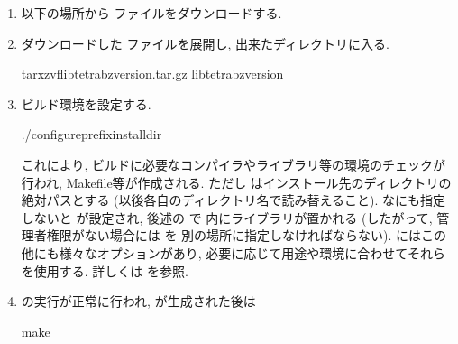 \documentclass[letterpaper,10pt,dvipdfmx,openany]{sphinxmanual}
\begin{document}
\label{\detokenize{install:id4}}\begin{enumerate}
%
\item {} 
\sphinxAtStartPar
以下の場所から  ファイルをダウンロードする.

\sphinxAtStartPar
{}

\item {} 
\sphinxAtStartPar
ダウンロードした  ファイルを展開し,
出来たディレクトリに入る.

\begin{sphinxVerbatim}[commandchars=\\\{\}]
\PYGZdl{}tarxzvflibtetrabz\PYGZhy{}version.tar.gz
\PYGZdl{}libtetrabz\PYGZhy{}version
\end{sphinxVerbatim}

\item {} 
\sphinxAtStartPar
ビルド環境を設定する.

\begin{sphinxVerbatim}[commandchars=\\\{\}]
\PYGZdl{}./configure\PYGZhy{}\PYGZhy{}prefixinstall\PYGZus{}dir
\end{sphinxVerbatim}

\sphinxAtStartPar
これにより, ビルドに必要なコンパイラやライブラリ等の環境のチェックが行われ,
Makefile等が作成される.
ただし  はインストール先のディレクトリの絶対パスとする (以後各自のディレクトリ名で読み替えること).
なにも指定しないと  が設定され, 後述の  で
 内にライブラリが置かれる (したがって, 管理者権限がない場合には  を
別の場所に指定しなければならない).
 にはこの他にも様々なオプションがあり, 必要に応じて用途や環境に合わせてそれらを使用する.
詳しくは {\hyperref[\detokenize{install:configoption}]{}} を参照.

\item {} 
\sphinxAtStartPar
{} の実行が正常に行われ,  が生成された後は

\begin{sphinxVerbatim}[commandchars=\\\{\}]
\PYGZdl{}make
\end{sphinxVerbatim}


\end{enumerate}
\end{document}
